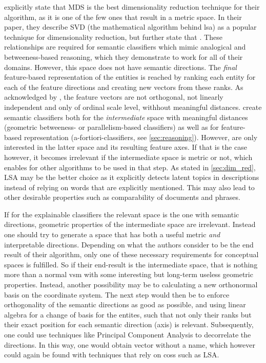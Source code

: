 \textcite{Derrac2015} explicitly state that MDS is the best dimensionality reduction technique for their algorithm, as it is one of the few ones that result in a metric space. In their paper, they describe SVD (the mathematical algorithm behind \gls{lsa}) as a popular technique for dimensionality reduction, but further state that  \cite[14]{Derrac2015}. These relationships are required for semantic classifiers which mimic analogical and betweeness-based reasoning, which they demonstrate to work for all of their domains. However, this space does not have semantic directions. The \textit{final} feature-based representation of the entities is reached by ranking each entity for each of the feature directions and creating new vectors from these ranks. As acknowledged by \textcite[22]{Derrac2015}, the feature vectors are not orthogonal, not linearly independent and only of ordinal scale level, withhout meaningful distances. \textcite{Derrac2015} create semantic classifiers both for the \textit{intermediate} space with meaningful distances (geometric betweeness- or parallelism-based classifiers) as well as for feature-based representation (a-fortiori-classifiers, see \autoref{sec:reasoning}). However, \textcite{Ager2018,Alshaikh2020} are only interested in the latter space and its resulting feature axes. If that is the case however, it becomes irrelevant if the intermediate space is metric or not, which enables for other algorithms to be used in that step. As stated in \autoref{sec:dim_red}, LSA may be the better choice as it explicitly detects latent topics in descriptions instead of relying on words that are explicitly mentioned. This may also lead to other desirable properties such as comparability of documents and phrases.

If for the explainable classifiers the relevant space is the one with semantic directions, geometric properties of the intermediate space are irrelevant. Instead one should try to generate a space that has both a useful metric \textit{and} interpretable directions. Depending on what the authors consider to be the end result of their algorithm, only one of these necessary requirements for conceptual spaces is fulfilled. So if their end-result is the intermediate space, that is nothing more than a normal \gls{vsm} with some interesting but long-term useless geometric properties. Instead, another possibility may be to calculating a new orthonormal basis on the coordinate system. The next step would then be to enforce orthogonality of the semantic directions as good as possible, and using linear algebra for a change of basis for the entites, such that not only their ranks but their exact position for each semantic direction (axis) is relevant. Subsequently, one could use techniques like Principal Component Analysis to decorrelate the directions. In this way, one would obtain vector without a name, which however could again be found with techniques that rely on \glspl{cos} such as LSA.

